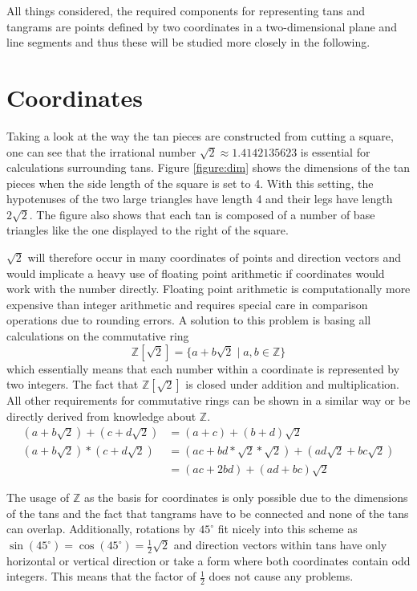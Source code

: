 All things considered, the required components for representing tans and tangrams are points defined by two coordinates in a two-dimensional plane and line segments and thus these will be studied more closely in the following.

\section{Coordinates}

Taking a look at the way the tan pieces are constructed from cutting a square, one can see that the irrational number $\sqrt{2} \approx 1.4142135623$ is essential for calculations surrounding tans. Figure \ref{figure:dim} shows the dimensions of the tan pieces when the side length of the square is set to 4. With this setting, the hypotenuses of the two large triangles have length 4 and their legs have length $2\sqrt{2}$. The figure also shows that each tan is composed of a number of base triangles like the one displayed to the right of the square. 


$\sqrt{2}$ will therefore occur in many coordinates of points and direction vectors and would implicate a heavy use of floating point arithmetic if coordinates would work with the number directly. Floating point arithmetic is computationally more expensive than integer arithmetic and requires special care in comparison operations due to rounding errors. A solution to this problem is basing all calculations on the commutative ring 
\[\mathbb{Z}[\sqrt{2}] = \{ a + b \sqrt{2} \;|  \; a,b \in \mathbb{Z}  \}\]
which essentially means that each number within a coordinate is represented by two integers. 
The fact that $\mathbb{Z}[\sqrt{2}]$ is closed under addition and multiplication. All other requirements for commutative rings can be shown in a similar way or be directly derived from knowledge about $\mathbb{Z}$.
\begin{align*}
(a + b \sqrt{2}) + (c + d \sqrt{2}) &= (a+c) + (b+d) \sqrt{2}\\
(a + b \sqrt{2}) * (c + d \sqrt{2}) &= (ac + bd*\sqrt{2}*\sqrt{2}) + (ad\sqrt{2} + bc\sqrt{2}) \\&= (ac + 2bd) + (ad+bc)\sqrt{2}
\end{align*}

The usage of $ \mathbb{Z}$ as the basis for coordinates is only possible due to the dimensions of the tans and the fact that tangrams have to be connected and none of the tans can overlap. Additionally, rotations by $45^\circ$ fit nicely into this scheme as $\sin(45^{\circ}) = \cos(45^{\circ})=  \frac{1}{2}\sqrt{2}$ and direction vectors within tans have only horizontal or vertical direction or take a form where both coordinates contain odd integers. This means that the factor of $\frac{1}{2}$ does not cause any problems. 
